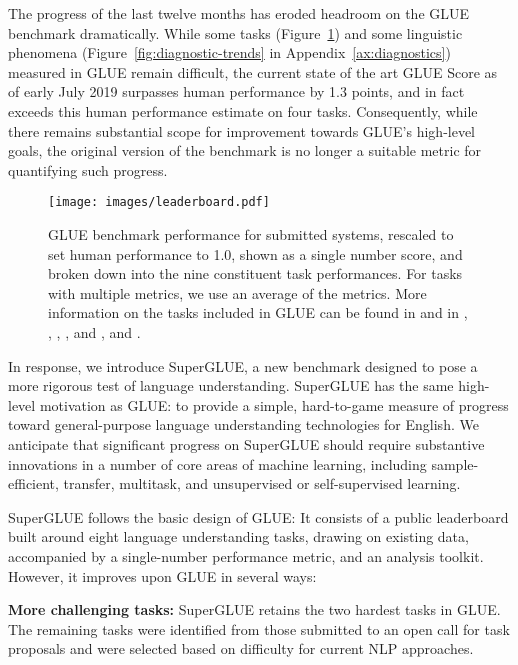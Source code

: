 The progress of the last twelve months has eroded headroom on the GLUE benchmark dramatically. 
While some tasks (Figure~\ref{fig:benchmark-trends}) and some linguistic phenomena (Figure~\ref{fig:diagnostic-trends} in Appendix~\ref{ax:diagnostics}) measured in GLUE remain difficult, 
the current state of the art GLUE Score as of early July 2019
\citep[88.4 from][]{yang2019xlnet}
surpasses human performance \citep[87.1 from][]{nangia2019human} by 1.3 points, and in fact exceeds this human performance estimate on four tasks.
Consequently, while there remains substantial scope for improvement towards GLUE's high-level goals, the original version of the benchmark is no longer a suitable metric for quantifying such progress.

\begin{figure}
    \centering
    \texttt{[image: images/leaderboard.pdf]}
    \caption{GLUE benchmark performance for submitted systems, rescaled to set human performance to 1.0, shown as a single number score, and broken down into the nine constituent task performances. For tasks with multiple metrics, we use an average of the metrics. More information on the tasks included in GLUE can be found in \citet{wang2018glue} and in \citet[CoLA]{warstadt2018neural}, \citet[SST-2]{socher2013recursive}, \citet[MRPC]{dolan2005automatically}, \citet[STS-B]{cer-etal-2017-semeval}, and \citet[MNLI]{williams2018broad}, and \citet[the original data source for QNLI]{rajpurkar2016}.}
    \label{fig:benchmark-trends}
\end{figure}

In response, we introduce SuperGLUE, a new benchmark designed to pose a more rigorous test of language understanding. SuperGLUE has the same high-level motivation as GLUE: to provide a simple, hard-to-game measure of progress toward general-purpose language understanding technologies for English. We anticipate that significant progress on SuperGLUE should require substantive innovations in a number of core areas of machine learning, including sample-efficient, transfer, multitask, and unsupervised or self-supervised learning.

SuperGLUE follows the basic design of GLUE: It consists of a public leaderboard built around eight language understanding tasks, drawing on existing data, accompanied by a single-number performance metric, and an analysis toolkit. 
However, it improves upon GLUE in several ways:

\textbf{More challenging tasks:} SuperGLUE retains the two hardest tasks in GLUE. The remaining tasks were identified from those submitted to an open call for task proposals and were selected based on difficulty for current NLP approaches.%

